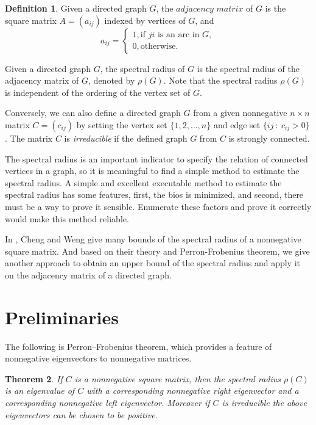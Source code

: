 \documentclass[12pt, a4paper]{article}
\theoremstyle{plain}
\newtheorem{thm}{Theorem}[section]
\theoremstyle{definition}
\newtheorem{defn}[thm]{Definition}
\begin{document}
\begin{defn}
    Given a directed graph $G$, the $\textit{adjacency matrix}$ of $G$ is the square
    matrix $A = (a_{ij})$ indexed by vertices of $G$, and
     \[a_{ij} =\begin{cases}
        1, \text{if $ji$ is an arc in $G$}, \\
        0, \text{otherwise.}
            \end{cases}
     \]
\end{defn}

Given a directed graph $G$, the spectral radius of $G$ is the
 spectral radius of the adjacency matrix of $G$, denoted by
 $\rho(G)$. Note that the spectral radius $\rho(G)$ is
 independent of the ordering of the vertex set of $G$. 



Conversely, we can also define a directed graph $G$ from a given
 nonnegative $n\times n$ matrix $C=(c_{ij})$  by setting the vertex
 set $\{1, 2, \ldots, n\}$ and edge set $\{ij~\colon~c_{ij}>0\}$.
 The matrix $C$ is {\it irreducible} if the defined graph $G$ from
 $C$ is strongly connected.  


The spectral radius is an important indicator to specify the relation
 of connected vertices in a graph, so it is meaningful to find a simple
 method to estimate the spectral radius. A simple and excellent
 executable method to estimate the spectral radius has some features,
 first, the bios is minimized, and second, there must be a way to prove
 it sensible. Enumerate these factors and prove it correctly would make this method reliable.

In \cite{chang}, Cheng and Weng give many bounds of the spectral radius of a nonnegative square matrix. And based on their theory and Perron-Frobenius theorem, we give another approach to obtain an upper bound of the spectral radius and apply it on the adjacency matrix of a directed graph.

\section{Preliminaries}

The following is Perron–Frobenius theorem, which provides a feature of
 nonnegative eigenvectors to nonnegative matrices.

\begin{thm} \cite{prn_fros2} \label{thm:Perron_Frobenius}
    If $C$ is a nonnegative square matrix, then the spectral radius $\rho(C)$ is an
    eigenvalue of $C$ with a corresponding nonnegative right eigenvector and a
    corresponding nonnegative left eigenvector.
    Moreover if $C$ is irreducible the above eigenvectors can be chosen to be positive. 
\end{thm}
\end{document}

